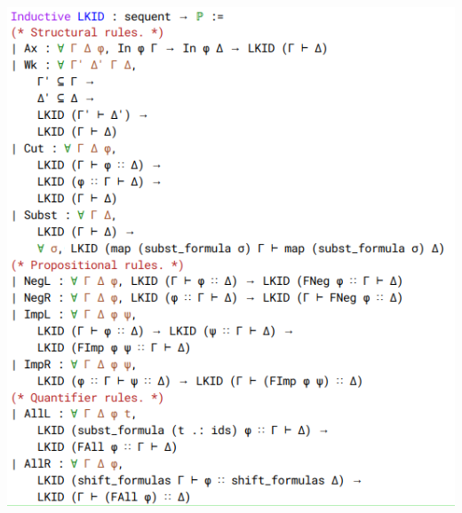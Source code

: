 \documentclass{beamer}
\begin{document}
\begin{frame}[plain]
  \includegraphics[height=\textheight]{pravila_obicna}
\end{frame}\addtocounter{framenumber}{-1}
\end{document}
